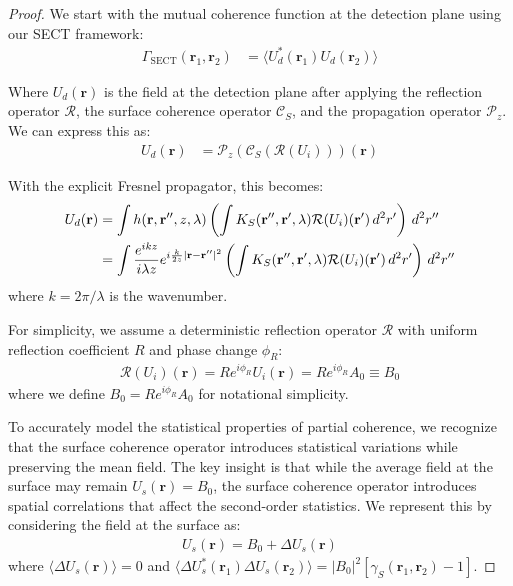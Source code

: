 \documentclass[a4paper,12pt]{article}
\begin{document}
\begin{proof}
We start with the mutual coherence function at the detection plane using our SECT framework:
\begin{align}
\Gamma_{\text{SECT}}(\mathbf{r}_1, \mathbf{r}_2) &= \langle U_d^*(\mathbf{r}_1) U_d(\mathbf{r}_2) \rangle
\end{align}

Where $U_d(\mathbf{r})$ is the field at the detection plane after applying the reflection operator $\mathcal{R}$, the surface coherence operator $\mathcal{C}_S$, and the propagation operator $\mathcal{P}_z$. We can express this as:
\begin{align}
U_d(\mathbf{r}) &= \mathcal{P}_z(\mathcal{C}_S(\mathcal{R}(U_i)))(\mathbf{r})
\end{align}

With the explicit Fresnel propagator, this becomes:
\begin{align}
U_d(\mathbf{r}) &= \int h(\mathbf{r}, \mathbf{r}'', z, \lambda) \left( \int K_S(\mathbf{r}'', \mathbf{r}', \lambda) \mathcal{R}(U_i)(\mathbf{r}') \, d^2r' \right) \, d^2r'' \\
&= \int \frac{e^{ikz}}{i\lambda z} e^{i\frac{k}{2z}|\mathbf{r} - \mathbf{r}''|^2} \left( \int K_S(\mathbf{r}'', \mathbf{r}', \lambda) \mathcal{R}(U_i)(\mathbf{r}') \, d^2r' \right) \, d^2r'' \notag
\end{align}
where $k = 2\pi/\lambda$ is the wavenumber.

For simplicity, we assume a deterministic reflection operator $\mathcal{R}$ with uniform reflection coefficient $R$ and phase change $\phi_R$:
\begin{align}
\mathcal{R}(U_i)(\mathbf{r}) = R e^{i\phi_R} U_i(\mathbf{r}) = R e^{i\phi_R} A_0 \equiv B_0
\end{align}
where we define $B_0 = R e^{i\phi_R} A_0$ for notational simplicity.

To accurately model the statistical properties of partial coherence, we recognize that the surface coherence operator introduces statistical variations while preserving the mean field. The key insight is that while the average field at the surface may remain $U_s(\mathbf{r}) = B_0$, the surface coherence operator introduces spatial correlations that affect the second-order statistics. We represent this by considering the field at the surface as:
\begin{align}
U_s(\mathbf{r}) = B_0 + \Delta U_s(\mathbf{r})
\end{align}
where $\langle \Delta U_s(\mathbf{r}) \rangle = 0$ and $\langle \Delta U_s^*(\mathbf{r}_1) \Delta U_s(\mathbf{r}_2) \rangle = |B_0|^2 [\gamma_S(\mathbf{r}_1, \mathbf{r}_2) - 1]$.


\end{proof}
\end{document}

